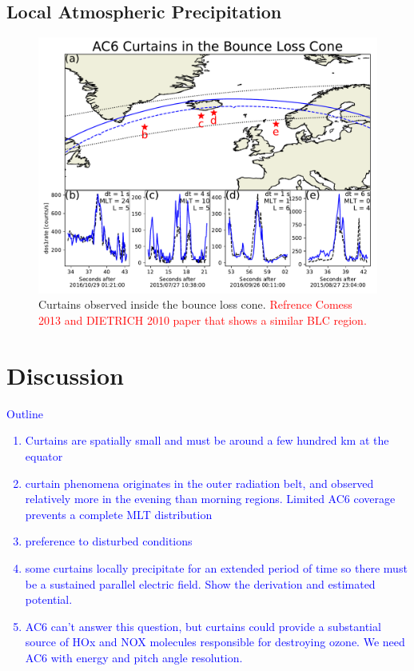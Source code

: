 \documentclass[draft]{agujournal2019}
\begin{document}
\subsection{Local Atmospheric Precipitation}
\begin{figure}
\includegraphics[width=\textwidth]{fig3.pdf}
\caption{Curtains observed inside the bounce loss cone. \textcolor{red}{Refrence Comess 2013 and DIETRICH 2010 paper that shows a similar BLC region.}}
\label{fig3}
\end{figure}

\section{Discussion} \label{discussion}
\textcolor{blue}{
Outline
\begin{enumerate}
\item Curtains are spatially small and must be around a few hundred km at the equator
\item curtain phenomena originates in the outer radiation belt, and observed relatively more in the evening than morning regions. Limited AC6 coverage prevents a complete MLT distribution
\item preference to disturbed conditions
\item some curtains locally precipitate for an extended period of time so there must be a sustained parallel electric field. Show the derivation and estimated potential.
\item AC6 can't answer this question, but curtains could provide a substantial source of HOx and NOX molecules responsible for destroying ozone. We need AC6 with energy and pitch angle resolution.
\end{enumerate}}
\end{document}
